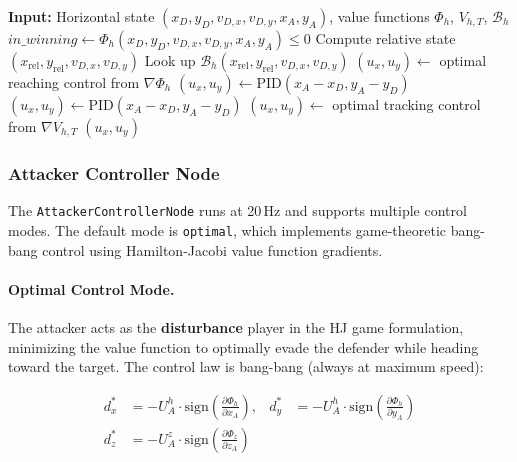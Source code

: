 \documentclass[11pt,a4paper]{article}
\begin{document}
\begin{algorithm}[H]
\caption{Horizontal Reach-Track-Avoid (Algorithm 2) --- with winning region guard}
\begin{algorithmic}[1]
\State \textbf{Input:} Horizontal state $(x_D, y_D, v_{D,x}, v_{D,y}, x_A, y_A)$, value functions $\Phi_h$, $V_{h,T}$, $\mathcal{B}_h$
\State $\textit{in\_winning} \gets \Phi_h(x_D, y_D, v_{D,x}, v_{D,y}, x_A, y_A) \leq 0$ 
\State Compute relative state $(x_\text{rel}, y_\text{rel}, v_{D,x}, v_{D,y})$
\State Look up $\mathcal{B}_h(x_\text{rel}, y_\text{rel}, v_{D,x}, v_{D,y})$
        \State $(u_x, u_y) \gets$ optimal reaching control from $\nabla\Phi_h$ 
    \Else
        \State $(u_x, u_y) \gets \text{PID}(x_A - x_D, y_A - y_D)$ 
    \EndIf
{}
    \State $(u_x, u_y) \gets \text{PID}(x_A - x_D, y_A - y_D)$ 
\Else
    \State $(u_x, u_y) \gets$ optimal tracking control from $\nabla V_{h,T}$ 
\EndIf
\State \Return $(u_x, u_y)$
\end{algorithmic}
\end{algorithm}

\subsubsection{Attacker Controller Node}

The \texttt{AttackerControllerNode} runs at 20\,Hz and supports multiple control modes. The default mode is \texttt{optimal}, which implements game-theoretic bang-bang control using Hamilton-Jacobi value function gradients.

\paragraph{Optimal Control Mode.}
The attacker acts as the \textbf{disturbance} player in the HJ game formulation, minimizing the value function to optimally evade the defender while heading toward the target. The control law is bang-bang (always at maximum speed):

\begin{align}
d_x^* &= -U_A^h \cdot \text{sign}\!\left(\frac{\partial \Phi_h}{\partial x_A}\right), &
d_y^* &= -U_A^h \cdot \text{sign}\!\left(\frac{\partial \Phi_h}{\partial y_A}\right) \label{eq:attacker-horiz}\\[4pt]
d_z^* &= -U_A^z \cdot \text{sign}\!\left(\frac{\partial \Phi_z}{\partial z_A}\right) \label{eq:attacker-vert}
\end{align}
\end{document}
